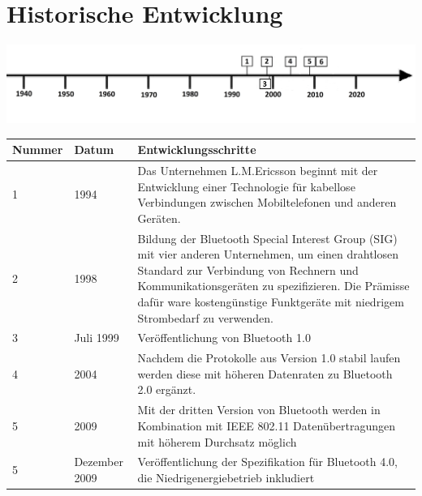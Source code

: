 \section*{Historische Entwicklung}
\includegraphics[width=\textwidth]{Kapitel/Bluetooth_4/Grafiken/zeitstrahl_bearbeitet}
\par
\noindent
\begin{tabular}{|p{1 cm}|p{3 cm}|p{13.55 cm}|}
	\hline
	Nummer & Datum & Entwicklungsschritte~\cite{Bluetooth_4.2}\\
	\hline
	1 & 1994 & Das Unternehmen L.M.Ericsson beginnt mit der Entwicklung einer Technologie für kabellose Verbindungen zwischen Mobiltelefonen und anderen Geräten.\\
	\hline
	2 & 1998 & Bildung der Bluetooth Special Interest Group (SIG) mit vier anderen Unternehmen, um einen drahtlosen Standard zur Verbindung von Rechnern und Kommunikationsgeräten zu spezifizieren. Die Prämisse dafür ware kostengünstige Funktgeräte mit niedrigem Strombedarf zu verwenden.\\
	\hline
	3 & Juli 1999 & Veröffentlichung von Bluetooth 1.0\\
	\hline
	4 & 2004 & Nachdem die Protokolle aus Version 1.0 stabil laufen werden diese mit höheren Datenraten zu Bluetooth 2.0 ergänzt.\\
	\hline
	5 & 2009 & Mit der dritten Version von Bluetooth werden in Kombination mit IEEE 802.11 Datenübertragungen mit höherem Durchsatz möglich\\
	\hline
	5 & Dezember 2009 & Veröffentlichung der Spezifikation für Bluetooth 4.0, die Niedrigenergiebetrieb inkludiert\\
	\hline
\end{tabular}
\par
